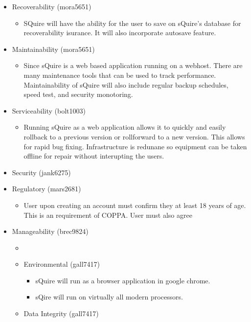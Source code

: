 \documentclass[11pt]{report}
\begin{document}
\begin{itemize}
\begin{itemize}
\begin{itemize}
        \end{itemize}
        \item Recoverability (mora5651) \begin{itemize}
            \item SQuire will have the ability for the user to save on sQuire's database for recoverability isurance. It will also incorporate autosave feature. 
            \end{itemize}
        \item Maintainability (mora5651) \begin{itemize}
            \item Since sQuire is a web based application running on a webhost. There are 
            many maintenance tools that can be used to track performance. Maintainability of sQuire will also include regular backup schedules, speed test, and security monotoring. 
            \end{itemize}
        \item Serviceability (bolt1003) \begin{itemize}
            \item Running sQuire as a web application allows it to quickly and easily rollback to a previous version or rollforward to a new version. This allows for rapid bug fixing. Infrastructure is redunane so equipment can be taken offline for repair without interupting the users.
        \end{itemize}
        \item Security (jank6275)
        \item Regulatory (mars2681) \begin{itemize}
            \item User upon creating an account must confirm they at least 18 years of age. This is an requirement of COPPA. User must also agree \end{itemize}
        \item Manageability (brec9824) \begin{itemize}
            \item 
        \item Environmental (gall7417) \begin{itemize}
            \item sQuire will run as a browser application in google chrome.
            \item sQire will run on virtually all modern processors.\end{itemize}
        \item Data Integrity (gall7417) \begin{itemize}

\end{itemize}
\end{itemize}
\end{itemize}
\end{itemize}
\end{document}
